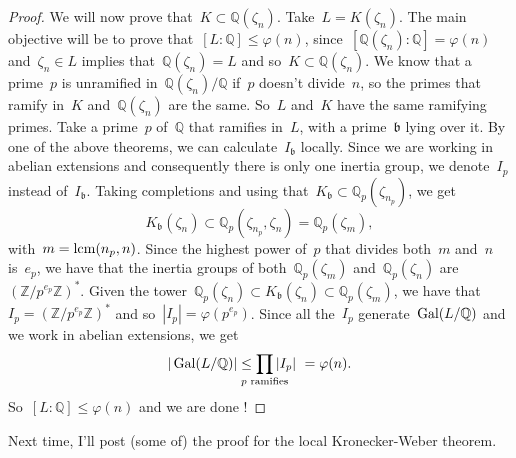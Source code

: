 \begin{theorem}
\begin{proof}
    We will now prove that~$K \subset \mathbb{Q}(\zeta_n)$. Take~$L = K(\zeta_n)$. The main objective will be to prove that~$\left[L:\mathbb{Q}\right] \leq \varphi(n)$, since~$\left[\mathbb{Q}(\zeta_n):\mathbb{Q}\right] = \varphi(n)$ and~$\zeta_n \in L$ implies that~$\mathbb{Q}(\zeta_n) = L$ and so~$K \subset \mathbb{Q}(\zeta_n)$.
    We know that a prime~$p$ is unramified in~$\mathbb{Q}(\zeta_n)/\mathbb{Q}$ if~$p$ doesn't divide~$n$, so the primes that ramify in~$K$ and~$\mathbb{Q}(\zeta_n)$ are the same. So~$L$ and~$K$ have the same ramifying primes. Take a prime~$p$ of~$\mathbb{Q}$ that ramifies in~$L$, with a prime~$\mathfrak{b}$ lying over it. By one of the above theorems, we can calculate~$I_{\mathfrak{b}}$ locally. Since we are working in abelian extensions and consequently there is only one inertia group, we denote~$I_p$ instead of~$I_{\mathfrak{b}}$. Taking completions and using that~$K_\mathfrak{b} \subset \mathbb{Q}_p(\zeta_{n_p})$, we get
    \begin{equation}
      K_\mathfrak{b}(\zeta_n) \subset \mathbb{Q}_p(\zeta_{n_p},\zeta_n) = \mathbb{Q}_p(\zeta_m), 
    \end{equation}
    with~$m = \operatorname{lcm}(n_p,n)$. Since the highest power of~$p$ that divides both~$m$ and~$n$ is~$e_p$, we have that the inertia groups of both~$\mathbb{Q}_p(\zeta_m)$ and~$\mathbb{Q}_p(\zeta_n)$ are~$(\mathbb{Z}/p^{e_p}\mathbb{Z})^*$. Given the tower~$\mathbb{Q}_p(\zeta_n) \subset K_\mathfrak{b}(\zeta_n) \subset \mathbb{Q}_p(\zeta_m)$, we have that~$I_p = (\mathbb{Z}/p^{e_p}\mathbb{Z})^*$ and so~$|I_p| = \varphi(p^{e_p})$. Since all the~$I_p$ generate~$\operatorname{Gal}(L/\mathbb{Q})$ and we work in abelian extensions, we get
    \begin{equation}
      |\Gal(L/\mathbb{Q})|\leq \prod_{\mathclap{p \text{ ramifies}}} |I_p|  = \varphi(n). 
    \end{equation}
    So~$\left[L:\mathbb{Q}\right] \leq \varphi(n)$ and we are done !
  \end{proof}
\end{theorem}

Next time, I'll post (some of) the proof for the local Kronecker-Weber theorem.
